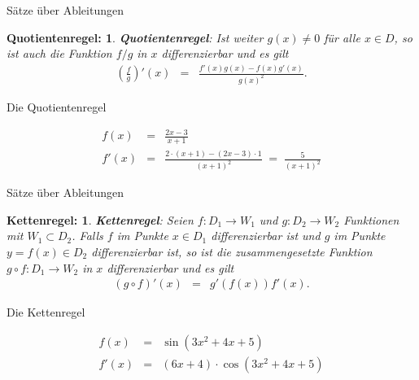 \documentclass[german]{beamer}
\newcommand{\bq}{\begin{eqnarray*}}
\newcommand{\eq}{\end{eqnarray*}}
\newtheorem*{mytheorem24}{Quotientenregel:}
\newtheorem*{mytheorem25}{Kettenregel:}
\begin{document}
\begin{frame}{S\"atze \"uber Ableitungen}

\begin{mytheorem24}
{\bf Quotientenregel}: 
Ist weiter $g(x)\neq 0$ f\"ur alle $x\in D$, so ist auch die Funktion $f/g$ in $x$ differenzierbar und es gilt
\bq
 \left( \frac{f}{g} \right)'(x) & = &
 \frac{f'(x) g(x) - f(x) g'(x)}{g(x)^2}.
\eq
\end{mytheorem24}

\end{frame}

\begin{frame}{Die Quotientenregel}

\begin{example}
\bq
 f\left(x\right) & = & \frac{2x-3}{x+1}
 \nonumber \\
 f'\left(x\right) & = & 
 \frac{2 \cdot \left(x+1\right)-\left(2x-3\right) \cdot 1}{\left(x+1\right)^2}
 \; = \;
 \frac{5}{\left(x+1\right)^2}
\eq
\end{example}

\end{frame}

\begin{frame}{S\"atze \"uber Ableitungen}

\begin{mytheorem25}
{\bf Kettenregel}: Seien $f : D_1 \rightarrow W_1$ und $g : D_2 \rightarrow W_2$ Funktionen mit
$W_1 \subset D_2$. Falls $f$ im Punkte $x\in D_1$ differenzierbar ist und $g$ im Punkte $y=f(x)\in D_2$
differenzierbar ist, so ist die zusammengesetzte Funktion $g \circ f: D_1 \rightarrow W_2$
in $x$ differenzierbar und es gilt
\bq
 \left( g \circ f \right)'(x) & = & g'\left(f(x)\right) f'(x).
\eq
\end{mytheorem25}

\end{frame}

\begin{frame}{Die Kettenregel}

\begin{example}
\bq
 f\left(x\right) & = & \sin\left(3x^2+4x+5\right)
 \nonumber \\
 f'\left(x\right) & = & 
 \left(6x+4\right) \cdot \cos\left(3x^2+4x+5\right)
\eq
\end{example}

\end{frame}
\end{document}
